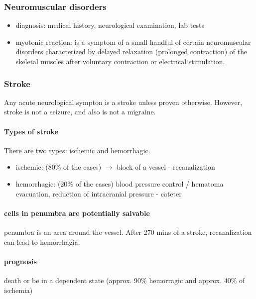\documentclass[12pt,article,oneside,a4paper]{memoir}
\begin{document}
\subsubsection{Neuromuscular disorders}
\begin{itemize}
\item diagnosis: medical history, neurological examination, lab tests
\item myotonic reaction: is a symptom of a small handful of certain
neuromuscular disorders characterized by delayed relaxation (prolonged
contraction) of the skeletal muscles after voluntary contraction or electrical
stimulation.
\end{itemize}

\subsubsection{Stroke} 
Any acute neurological sympton is a stroke unless proven otherwise. However,
stroke is not a seizure, and also is not a migraine.

\paragraph{Types of stroke}
There are two types: ischemic and hemorrhagic.

\begin{itemize}
\item ischemic: (80\% of the cases) $\rightarrow$ block of a vessel -
recanalization
\item hemorrhagic: (20\% of the cases) blood pressure control / hematoma
evacuation, reduction of intracranial pressure - cateter
\end{itemize}

\paragraph{cells in penumbra are potentially salvable}
penumbra is an area around the vessel. After 270 mins of a stroke,
recanalization can lead to  hemorrhagia.

\paragraph{prognosis}
death or be in a dependent state (approx. 90\% hemorragic and approx. 40\% of
ischemia)
\end{document}
